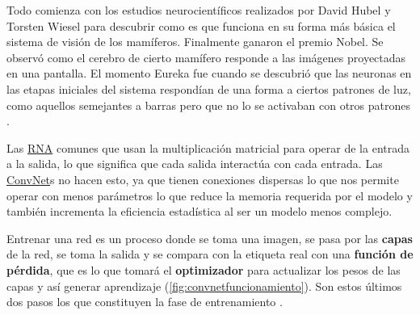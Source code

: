 Todo comienza con los estudios neurocientíficos realizados por David Hubel y
Torsten Wiesel para descubrir como es que funciona en su forma más básica el
sistema de visión de los mamíferos. Finalmente ganaron el premio Nobel. Se
observó como el cerebro de cierto mamífero responde a las imágenes proyectadas
en una pantalla. El momento Eureka fue cuando se descubrió que las neuronas en
las etapas iniciales del sistema respondían de una forma a ciertos patrones de
luz, como aquellos semejantes a barras pero que no lo se activaban con otros
patrones \cite{Learningb}.

Las \hyperlink{abbr}{RNA} comunes que usan la multiplicación matricial para
operar de la entrada a la salida, lo que significa que cada salida interactúa
con cada entrada. Las \hyperlink{abbr}{ConvNet}s no hacen esto, ya que tienen
conexiones dispersas lo que nos permite operar con menos parámetros lo que
reduce la memoria requerida por el modelo y también incrementa la eficiencia
estadística al ser un modelo menos complejo.

Entrenar una red es un proceso donde se toma una imagen, se pasa por las
\textbf{capas} de la red, se toma la salida y se compara con la etiqueta real
con una \textbf{función de pérdida}, que es lo que tomará el
\textbf{optimizador} para actualizar los pesos de las capas y así generar
aprendizaje (\autoref{fig:convnetfuncionamiento}). Son estos últimos dos pasos
los que constituyen la fase de entrenamiento \cite{Chollet2018}. 

